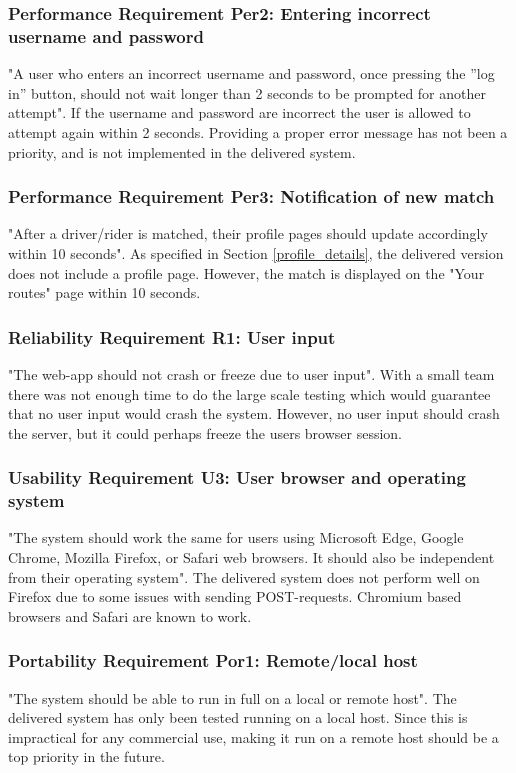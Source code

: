 \documentclass{article}
\begin{document}
\subsubsection{Performance Requirement Per2: Entering incorrect username and password}
"A user who enters an incorrect username and password, once pressing the ”log in” button, should not wait longer than 2 seconds to be prompted for another attempt"\cite{PRD}. If the username and password are incorrect the user is allowed to attempt again within 2 seconds. Providing a proper error message has not been a priority, and is not implemented in the delivered system.

\subsubsection{Performance Requirement Per3: Notification of new match}
"After a driver/rider is matched, their profile pages should update accordingly within 10 seconds"\cite{PRD}. As specified in Section \ref{profile_details}, the delivered version does not include a profile page. However, the match is displayed on the "Your routes" page within 10 seconds.

\subsubsection{Reliability Requirement R1: User input}
"The web-app should not crash or freeze due to user input"\cite{PRD}. With a small team there was not enough time to do the large scale testing which would guarantee that no user input would crash the system. However, no user input should crash the server, but it could perhaps freeze the users browser session.

\subsubsection{Usability Requirement U3: User browser and operating system}
"The system should work the same for users using Microsoft Edge, Google Chrome, Mozilla Firefox, or Safari web browsers. It should also be independent from their operating system"\cite{PRD}. The delivered system does not perform well on Firefox due to some issues with sending POST-requests. Chromium based browsers and Safari are known to work.

\subsubsection{Portability Requirement Por1: Remote/local host}
"The system should be able to run in full on a local or remote host"\cite{PRD}. The delivered system has only been tested running on a local host. Since this is impractical for any commercial use, making it run on a remote host should be a top priority in the future.
\end{document}
